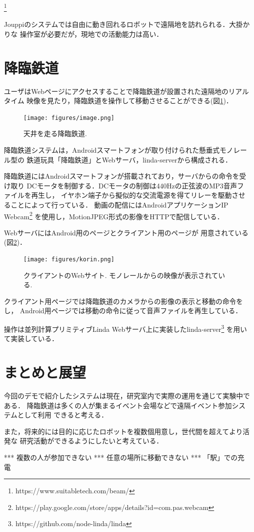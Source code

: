 \documentclass[submit,techreq]{ipsj}
\begin{document}
\footnote{
  \textsf{https://www.suitabletech.com/beam/}
}

Jouppiのシステム\cite{Jouppi:2002:FST:587078.587128}では自由に動き回れるロボットで遠隔地を訪れられる．大掛かりな
操作室が必要だが，現地での活動能力は高い．

\section{降臨鉄道}

ユーザはWebページにアクセスすることで降臨鉄道が設置された遠隔地のリアルタイム
映像を見たり，降臨鉄道を操作して移動させることができる(図\ref{monorail})．

\begin{figure}[H]
\begin{center}
\texttt{[image: figures/image.png]}
\end{center}
\caption{天井を走る降臨鉄道.}
\label{monorail}
\end{figure}


降臨鉄道システムは，Androidスマートフォンが取り付けられた懸垂式モノレール型の
鉄道玩具「降臨鉄道」とWebサーバ，linda-serverから構成される．

降臨鉄道にはAndroidスマートフォンが搭載されており，サーバからの命令を受け取り
DCモータを制御する．DCモータの制御は440Hzの正弦波のMP3音声ファイルを再生し，
イヤホン端子から擬似的な交流電源を得てリレーを駆動させることによって行っている．
動画の配信にはAndroidアプリケーションIP Webcam\footnote{
  \textsf{https://play.google.com/store/apps/details?id=com.pas.webcam}
}
を使用し，MotionJPEG形式の影像をHTTPで配信している．

WebサーバにはAndroid用のページとクライアント用のページが
用意されている(図\ref{browser})．

\begin{figure}[H]
\begin{center}
\texttt{[image: figures/korin.png]}
\end{center}
\caption{クライアントのWebサイト. モノレールからの映像が表示されている.}
\label{browser}
\end{figure}

クライアント用ページでは降臨鉄道のカメラからの影像の表示と移動の命令をし，
Android用ページでは移動の命令に従って音声ファイルを再生している．

操作は並列計算プリミティブLinda\cite{Carriero:1989:LC:63334.63337}
Webサーバ上に実装したlinda-server\footnote{
  \textsf{https://github.com/node-linda/linda}
}
を用いて実装している．

\section{まとめと展望}

今回のデモで紹介したシステムは現在，研究室内で実際の運用を通じて実験中である．
降臨鉄道は多くの人が集まるイベント会場などで遠隔イベント参加システムとして利用
できると考える．

また，将来的には目的に応じたロボットを複数個用意し，世代間を超えてより活発な
研究活動ができるようにしたいと考えている．


*** 複数の人が参加できない *** 任意の場所に移動できない *** 「駅」での充電

{\scriptsize


}
\end{document}
